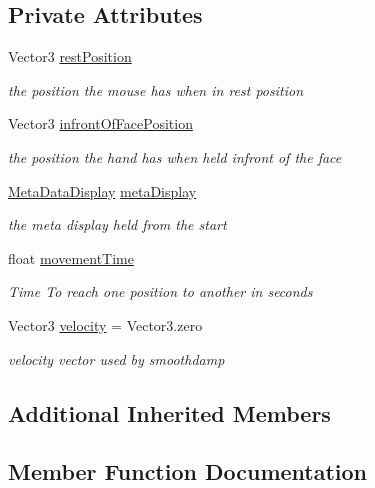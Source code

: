 \subsection*{Private Attributes}
\begin{DoxyCompactItemize}
\item 
Vector3 \mbox{\hyperlink{class_p_c_player_hand_a67a82329e791c5fce99188ba601e229d}{rest\+Position}}
\begin{DoxyCompactList}\small\item\em the position the mouse has when in rest position \end{DoxyCompactList}\item 
Vector3 \mbox{\hyperlink{class_p_c_player_hand_a25ff91db9893158f5185b4826d563e60}{infront\+Of\+Face\+Position}}
\begin{DoxyCompactList}\small\item\em the position the hand has when held infront of the face \end{DoxyCompactList}\item 
\mbox{\hyperlink{class_meta_data_display}{Meta\+Data\+Display}} \mbox{\hyperlink{class_p_c_player_hand_a132e4dc18579e0b2b561857fafaca912}{meta\+Display}}
\begin{DoxyCompactList}\small\item\em the meta display held from the start \end{DoxyCompactList}\item 
float \mbox{\hyperlink{class_p_c_player_hand_aaa5dc972ddaedd270c6f4c19a4c4f61b}{movement\+Time}}
\begin{DoxyCompactList}\small\item\em Time To reach one position to another in seconds \end{DoxyCompactList}\item 
Vector3 \mbox{\hyperlink{class_p_c_player_hand_a15c7717a137aa7790c06f2bdf9b247a1}{velocity}} = Vector3.\+zero
\begin{DoxyCompactList}\small\item\em velocity vector used by smoothdamp \end{DoxyCompactList}\end{DoxyCompactItemize}
\subsection*{Additional Inherited Members}


\subsection{Member Function Documentation}
\mbox{\label{class_p_c_player_hand_a42c7ffd95f8493901c93e2c1e4576585}} 
